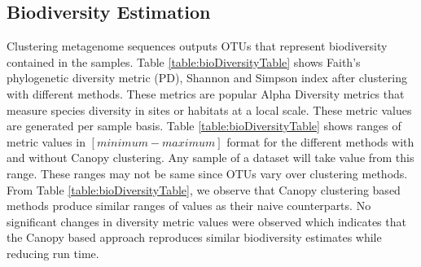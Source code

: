 \documentclass[10pt, conference, compsocconf]{IEEEtran}
\begin{document}
\subsection{\textbf{Biodiversity Estimation}} Clustering metagenome sequences outputs OTUs that represent biodiversity contained in the samples. Table 
\ref{table:bioDiversityTable} shows Faith’s phylogenetic diversity metric (PD), Shannon and Simpson index after clustering
with different methods. These metrics are 
popular Alpha Diversity metrics that measure species diversity in sites or habitats at 
a local scale. These metric values are generated per sample basis. Table \ref{table:bioDiversityTable} shows ranges of metric values
in $[minimum-maximum]$ format  for the different 
methods with and without Canopy clustering. Any sample of a dataset will take value from this range. These ranges may not be same since OTUs vary over clustering methods. From Table  \ref{table:bioDiversityTable}, we observe 
that Canopy clustering based methods produce similar ranges of values as their naive counterparts. No significant changes in diversity metric values 
were observed which indicates that the 
Canopy based approach reproduces similar biodiversity estimates while reducing run time.
\end{document}

